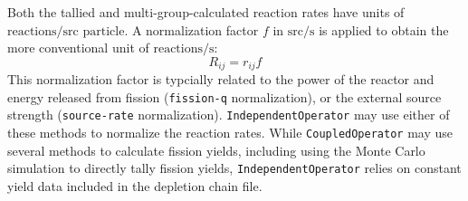         Both the tallied and multi-group-calculated reaction rates have units of
        $\text{reactions}/\text{src particle}$. A normalization factor
        $f$ in $\text{src}/\text{s}$ is applied to obtain the more
        conventional unit of $\text{reactions}/\text{s}$:
        \begin{equation}
            R_{ij} = r_{ij} f
        \end{equation}
        This normalization factor is typcially related to the power of the
        reactor and energy released from fission (\verb.fission-q.
        normalization), or the external source strength (\verb.source-rate.
        normalization). \verb.IndependentOperator. may use either of these methods to normalize
        the reaction rates. While \verb.CoupledOperator. may use several methods to
        calculate fission yields, including using the Monte Carlo simulation to
        directly tally fission yields, \verb.IndependentOperator. relies on
        constant yield data included in the depletion chain file.
